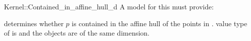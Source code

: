 \begin{ccRefFunctionObjectConcept}{Kernel::Contained_in_affine_hull_d}
A model for this must provide:


{determines whether $p$ is contained in the affine hull
of the points in \ccc{A = tuple [first,last)}.
\ccPrecond value type of  is 
and the objects are of the same dimension.}

\end{ccRefFunctionObjectConcept}
